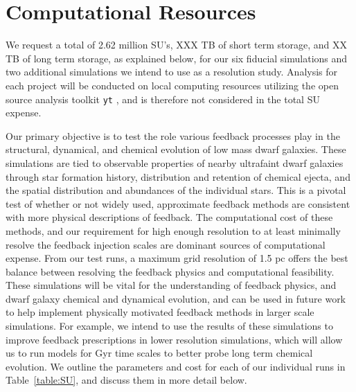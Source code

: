 \documentclass[11pt]{article}
\begin{document}
\section{Computational Resources}
We request a total of 2.62 million SU's, XXX TB of short term storage, and XX TB of long term storage, as explained below, for our six fiducial simulations and two additional simulations we intend to use as a resolution study. Analysis for each project will be conducted on local computing resources utilizing the open source analysis toolkit \texttt{yt} \citep{yt}, and is therefore not considered in the total SU expense.

Our primary objective is to test the role various feedback processes play in the structural, dynamical, and chemical evolution of low mass dwarf galaxies. These simulations are tied to observable properties of nearby ultrafaint dwarf galaxies through star formation history, distribution and retention of chemical ejecta, and the spatial distribution and abundances of the individual stars. This is a pivotal test of whether or not widely used, approximate feedback methods are consistent with more physical descriptions of feedback. The computational cost of these methods, and our requirement for high enough resolution to at least minimally resolve the feedback injection scales are dominant sources of computational expense. From our test runs, a maximum grid resolution of 1.5 pc offers the best balance between resolving the feedback physics and computational feasibility. These simulations will be vital for the understanding of feedback physics, and dwarf galaxy chemical and dynamical evolution, and can be used in future work to help implement physically motivated feedback methods in larger scale simulations. For example, we intend to use the results of these simulations to improve feedback prescriptions in lower resolution simulations, which will allow us to run models for Gyr time scales to better probe long term chemical evolution. We outline the parameters and cost for each of our individual runs in Table~\ref{table:SU}, and discuss them in more detail below.
\end{document}
